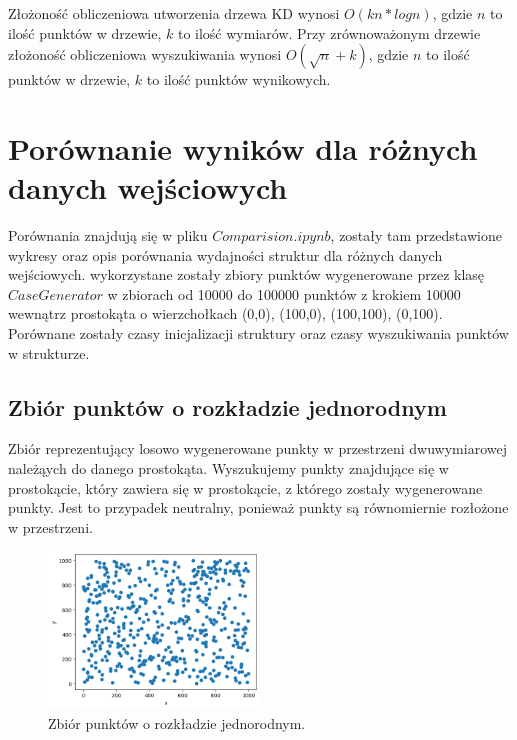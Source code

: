 \documentclass{lab}
\begin{document}
Złożoność obliczeniowa utworzenia drzewa KD wynosi $O(kn*logn)$, gdzie $n$ to ilość punktów w drzewie, $k$ to ilość wymiarów. Przy zrównoważonym drzewie złożoność obliczeniowa wyszukiwania wynosi $O(\sqrt{n}+k)$, gdzie $n$ to ilość punktów w drzewie, $k$ to ilość punktów wynikowych.

\section{Porównanie wyników dla różnych danych wejściowych}
Porównania znajdują się w pliku $Comparision.ipynb$, zostały tam przedstawione wykresy oraz opis porównania wydajności struktur dla różnych danych wejściowych.
wykorzystane zostały zbiory punktów wygenerowane przez klasę $CaseGenerator$ w zbiorach od 10000 do 100000 punktów z krokiem 10000 wewnątrz prostokąta o wierzchołkach (0,0), (100,0), (100,100), (0,100).
Porównane zostały czasy inicjalizacji struktury oraz czasy wyszukiwania punktów w strukturze.
\subsection{Zbiór punktów o rozkładzie jednorodnym}
Zbiór reprezentujący losowo wygenerowane punkty w przestrzeni dwuwymiarowej należąych do danego prostokąta.
Wyszukujemy punkty znajdujące się w prostokącie, który zawiera się w prostokącie, z którego zostały wygenerowane punkty.
Jest to przypadek neutralny, ponieważ punkty są równomiernie rozłożone w przestrzeni.

\begin{figure}[H]
  \centering
  \includegraphics[width=0.5\textwidth]{resources/uniform.png}
  \caption{Zbiór punktów o rozkładzie jednorodnym.}
  \label{fig:uniform}
\end{figure}
\end{document}
